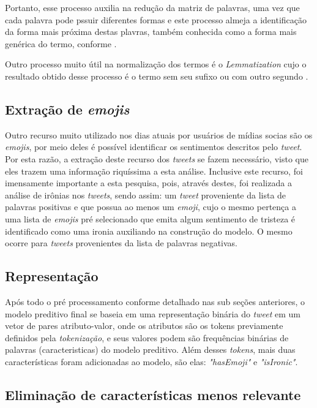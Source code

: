 Portanto, esse processo auxilia na redução da matriz de palavras, uma vez que cada palavra pode pssuir diferentes formas e este processo almeja a identificação da forma mais próxima destas plavras, também conhecida como a forma mais genérica do termo, conforme \cite{influence_of_word_normalization_on_text_classification}. 

Outro processo muito útil na normalização dos termos é o \textit{Lemmatization} cujo o resultado obtido desse processo é o termo sem seu sufixo ou com outro segundo \cite{influence_of_word_normalization_on_text_classification}.

\subsection{Extração de \textit{emojis}}

Outro recurso muito utilizado nos dias atuais por usuários de mídias socias são os \textit{emojis}, por meio deles é possível identificar os sentimentos descritos pelo \textit{tweet}. Por esta razão, a extração deste recurso dos \textit{tweets} se fazem necessário, visto que eles trazem uma informação riquíssima a esta análise. Inclusive este recurso, foi imensamente importante a esta pesquisa, pois, através destes, foi realizada a análise de irônias nos \textit{tweets}, sendo assim: um \textit{tweet} proveniente da lista de palavras positivas e que possua ao menos um \textit{emoji}, cujo o mesmo pertença a uma lista de \textit{emojis} pré selecionado que emita algum sentimento de tristeza é identificado como uma ironia auxiliando na construção do modelo. O mesmo ocorre para \textit{tweets} provenientes da lista de palavras negativas.

\subsection{Representação}

Após todo o pré processamento conforme detalhado nas sub seções anteriores, o modelo preditivo final se baseia em uma representação binária do \textit{tweet} em um vetor de pares atributo-valor, onde os atributos são os tokens previamente definidos pela \textit{tokenização}, e seus valores podem são frequências binárias de palavras (caracteristicas) do modelo preditivo. Além desses \textit{tokens}, mais duas características foram adicionadas ao modelo, são elas: \textit{"hasEmoji"} e \textit{"isIronic"}. 

\subsection{Eliminação de características menos relevante}

